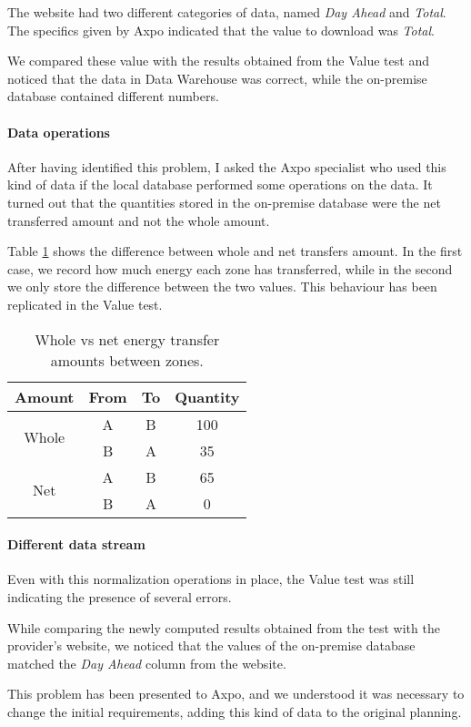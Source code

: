         The website had two different categories of data, named \textit{Day Ahead} and \textit{Total}.
        The specifics given by Axpo indicated that the value to download was \textit{Total}.
        
        We compared these value with the results obtained from the Value test and noticed that the data in Data Warehouse was correct, while the on-premise database contained different numbers.
    
    \paragraph{Data operations}
        After having identified this problem, I asked the Axpo specialist who used this kind of data if the local database performed some operations on the data.
        It turned out that the quantities stored in the on-premise database were the net transferred amount and not the whole amount.
        
        Table \ref{tab:tests:data:operations} shows the difference between whole and net transfers amount.
        In the first case, we record how much energy each zone has transferred, while in the second we only store the difference between the two values.
        This behaviour has been replicated in the Value test.
        
        \begin{table}
            \centering
            \begin{tabular}{|c|c c c|}
                \toprule
                Amount                 & From & To & Quantity \\
                \midrule
                \multirow{2}{*}{Whole} & A    & B  & 100      \\
                {}                     & B    & A  & 35       \\
                \midrule
                \multirow{2}{*}{Net}   & A    & B  & 65       \\
                {}                     & B    & A  & 0        \\
                \bottomrule
            \end{tabular}
            \caption{Whole vs net energy transfer amounts between zones.}
            \label{tab:tests:data:operations}
        \end{table}
        
        
        
    \paragraph{Different data stream}
        Even with this normalization operations in place, the Value test was still indicating the presence of several errors.
        
        While comparing the newly computed results obtained from the test with the provider's website, we noticed that the values of the on-premise database matched the \textit{Day Ahead} column from the website.
        
        This problem has been presented to Axpo, and we understood it was necessary to change the initial requirements, adding this kind of data to the original planning.
